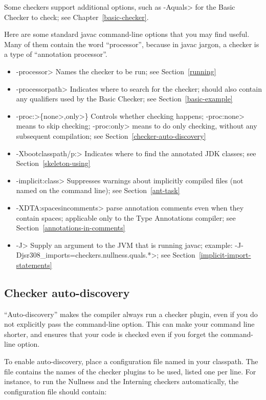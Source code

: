 \noindent
Some checkers support additional options, such as \<-Aquals> for the Basic
Checker to check; see Chapter~\ref{basic-checker}.


Here are some standard javac command-line options that you may find useful.
Many of them contain the word ``processor'', because in javac jargon, a
checker is a type of ``annotation processor''.

\begin{itemize}
\item \<-processor> Names the checker to be
  run; see Section~\ref{running}
\item \<-processorpath> Indicates where to search for the
  checker; should also contain any qualifiers used by the Basic
  Checker; see Section~\ref{basic-example}
\item \<-proc:>\{\<none>,\<only>\} Controls whether checking
  happens; \<-proc:none>
  means to skip checking; \<-proc:only> means to do only
  checking, without any subsequent compilation; see
  Section~\ref{checker-auto-discovery}
\item \<-Xbootclasspath/p:> Indicates where to find the annotated JDK classes;
  see Section~\ref{skeleton-using}
\item \<-implicit:class> Suppresses warnings about implicitly compiled files
  (not named on the command line); see Section~\ref{ant-task}
\item \<-XDTA:spacesincomments> parse annotation comments even when they
  contain spaces; applicable only to the Type Annotations compiler; see Section~\ref{annotations-in-comments}
\item \<-J> Supply an argument to the JVM that is running javac; example:
  \<-J-Djsr308\_imports=checkers.nullness.quals.*>; see Section~\ref{implicit-import-statements}
\end{itemize}


\subsection{Checker auto-discovery\label{checker-auto-discovery}}

``Auto-discovery'' makes the  compiler always run a checker
plugin, even if you do not explicitly pass the 
command-line option.  This can make your command line shorter, and ensures
that your code is checked even if you forget the command-line option.

To enable auto-discovery, place a configuration file named
in your classpath.  The file contains the names of the checker plugins to
be used, listed one per line.  For instance, to run the Nullness and the
Interning checkers automatically, the configuration file should contain:


